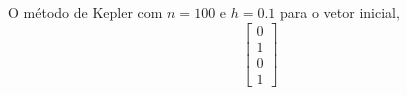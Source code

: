 \documentclass[a4paper,12pt]{article}
\begin{document}
\begin{figure}[!h]
	\centering
\end{figure}
O m\'etodo de Kepler com $n = 100$ e $h = 0.1$ para o vetor inicial,
\[\left [ 
	\begin{array}{c}
		0 \\
		1 \\
		0 \\
		1
	\end{array}
\right ] 
\]
\begin{figure}[!h]
	\centering
\end{figure}
\end{document}
